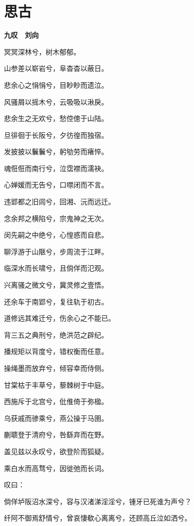 \documentclass[12pt,a4paper]{ctexbook}
\begin{document}
\section{思古}
\textbf{九叹　刘向}\par\vspace{0.5em}
冥冥深林兮，树木郁郁。\par
山参差以崭岩兮，阜杳杳以蔽日。\par
悲余心之悁悁兮，目眇眇而遗泣。\par
风骚屑以摇木兮，云吸吸以湫戾。\par
悲余生之无欢兮，愁倥傯于山陆。\par
旦徘徊于长阪兮，夕彷徨而独宿。\par
发披披以鬤鬤兮，躬劬劳而瘏悴。\par
魂俇俇而南行兮，泣霑襟而濡袂。\par
心婵媛而无告兮，口噤闭而不言。\par
违郢都之旧闾兮，回湘、沅而远迁。\par
念余邦之横陷兮，宗鬼神之无次。\par
闵先嗣之中绝兮，心惶惑而自悲。\par
聊浮游于山陿兮，步周流于江畔。\par
临深水而长啸兮，且倘佯而氾观。\par
兴离骚之微文兮，冀灵修之壹悟。\par
还余车于南郢兮，复往轨于初古。\par
道修远其难迁兮，伤余心之不能已。\par
背三五之典刑兮，绝洪范之辟纪。\par
播规矩以背度兮，错权衡而任意。\par
操绳墨而放弃兮，倾容幸而侍侧。\par
甘棠枯于丰草兮，藜棘树于中庭。\par
西施斥于北宫兮，仳倠倚于弥楹。\par
乌获戚而骖乘兮，燕公操于马圉。\par
蒯聩登于清府兮，咎繇弃而在野。\par
盖见兹以永叹兮，欲登阶而狐疑。\par
乘白水而高骛兮，因徙弛而长词。\par
叹曰：\par
倘佯垆阪沼水深兮，容与汉渚涕淫淫兮，锺牙已死谁为声兮？\par
纤阿不御焉舒情兮，曾哀悽欷心离离兮，还顾高丘泣如洒兮。\par
\end{document}
